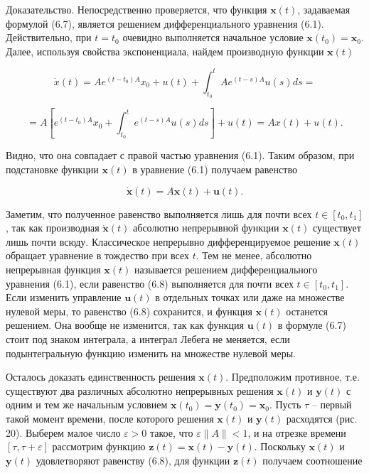 \documentclass[8pt]{extarticle}
\begin{document}
Доказательство. Непосредственно проверяется, что функция \(\mathbf{x}\left( t\right)\), задаваемая формулой (6.7), является решением дифференциального уравнения (6.1). Действительно, при \(t = t_{0}\) очевидно выполняется начальное условие \(\mathbf{x}\left( t_{0}\right) = \mathbf{x}_{0}\). Далее, используя свойства экспоненциала, найдем производную функции \(\mathbf{x}\left( t\right)\)

\[
\dot{x}\left( t\right)  = A{e}^{\left( {t - {t}_{0}}\right) A}{x}_{0} + u\left( t\right)  + {\int }_{{t}_{0}}^{t}A{e}^{\left( {t - s}\right) A}u\left( s\right) {ds} =
\]

\[
= A\left\lbrack  {{e}^{\left( {t - {t}_{0}}\right) A}{x}_{0} + {\int }_{{t}_{0}}^{t}{e}^{\left( {t - s}\right) A}u\left( s\right) {ds}}\right\rbrack   + u\left( t\right)  = {Ax}\left( t\right)  + u\left( t\right) .
\]

Видно, что она совпадает с правой частью уравнения (6.1). Таким образом, при подстановке функции \(\mathbf{x}\left( t\right)\) в уравнение (6.1) получаем равенство

\[
\dot{\mathbf{x}}\left( t\right)  = A\mathbf{x}\left( t\right)  + \mathbf{u}\left( t\right) . \tag{6.8}
\]

Заметим, что полученное равенство выполняется лишь для почти всех \(t \in \left[ t_{0},t_{1}\right]\), так как производная \(\dot{\mathbf{x}}\left( t\right)\) абсолютно непрерывной функции \(\mathbf{x}\left( t\right)\) существует лишь почти всюду. Классическое непрерывно дифференцируемое решение \(\mathbf{x}\left( t\right)\) обращает уравнение в тождество при всех \(t\). Тем не менее, абсолютно непрерывная функция \(\mathbf{x}\left( t\right)\) называется решением дифференциального уравнения (6.1), если равенство (6.8) выполняется для почти всех \(t \in \left[ t_{0},t_{1}\right]\). Если изменить управление \(\mathbf{u}\left( t\right)\) в отдельных точках или даже на множестве нулевой меры, то равенство (6.8) сохранится, и функция \(\mathbf{x}\left( t\right)\) останется решением. Она вообще не изменится, так как функция \(\mathbf{u}\left( t\right)\) в формуле (6.7) стоит под знаком интеграла, а интеграл Лебега не меняется, если подынтегральную функцию изменить на множестве нулевой меры.

Осталось доказать единственность решения \(\mathbf{x}\left( t\right)\). Предположим противное, т.е. существуют два различных абсолютно непрерывных решения \(\mathbf{x}\left( t\right)\) и \(\mathbf{y}\left( t\right)\) с одним и тем же начальным условием \(\mathbf{x}\left( t_{0}\right) = \mathbf{y}\left( t_{0}\right) = \mathbf{x}_{0}\). Пусть \(\tau\) -- первый такой момент времени, после которого решения \(\mathbf{x}\left( t\right)\) и \(\mathbf{y}\left( t\right)\) расходятся (рис. 20). Выберем малое число \(\varepsilon > 0\) такое, что \(\varepsilon \|A\| < 1\), и на отрезке времени \(\left[ \tau,\tau + \varepsilon \right]\) рассмотрим функцию \(\mathbf{z}\left( t\right) = \mathbf{x}\left( t\right) - \mathbf{y}\left( t\right)\). Поскольку \(\mathbf{x}\left( t\right)\) и \(\mathbf{y}\left( t\right)\) удовлетворяют равенству (6.8), для функции \(\mathbf{z}\left( t\right)\) получаем соотношение
\end{document}
